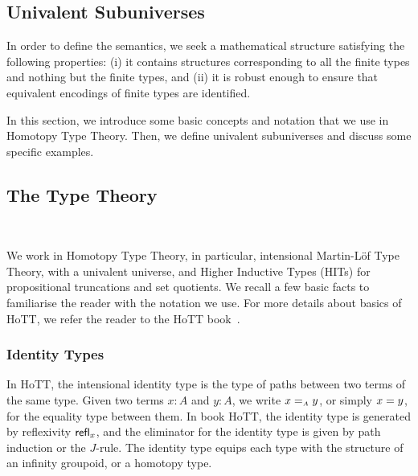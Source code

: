 \subsection{Univalent Subuniverses}
\label{sec:univalent}

In order to define the semantics, we seek a mathematical structure satisfying the following properties: (i) it contains structures corresponding to all the finite types and nothing but the finite types, and (ii) it is robust enough to ensure that equivalent encodings of finite types are identified. 

 In this section, we introduce some basic concepts and notation that we use in Homotopy Type Theory. Then, we define
univalent subuniverses and discuss some specific examples.

\subsection{The Type Theory}~\label{subsec:type-theory}

We work in Homotopy Type Theory, in particular, intensional Martin-L\"{o}f Type Theory, with a univalent universe, and
Higher Inductive Types (HITs) for propositional truncations and set quotients. We recall a few basic facts to
familiarise the reader with the notation we use. For more details about basics of HoTT, we refer the reader to the HoTT
book~\cite{univalentfoundationsprogramHomotopyTypeTheory2013}.


\subsubsection{Identity Types}


In HoTT, the intensional identity type is the type of paths between two terms of the same type. Given two terms $x:A$
and $y:A$, we write $x \id_{A} y$, or simply $x \id y$, for the equality type between them. In book HoTT, the identity
type is generated by reflexivity $\refl_{x}$, and the eliminator for the identity type is given by path induction or the
$J$-rule. The identity type equips each type with the structure of an infinity groupoid, or a homotopy type.


